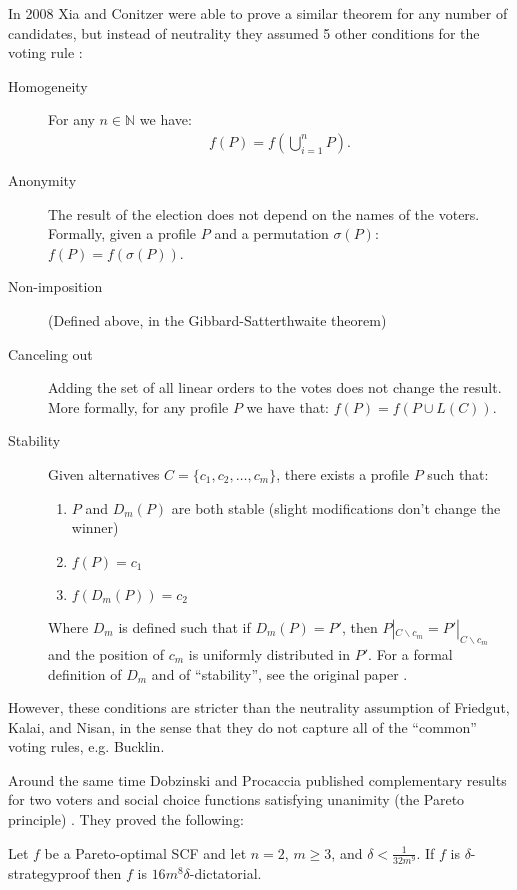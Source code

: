 	In 2008 Xia and Conitzer were able to prove a similar theorem for any number of candidates, but instead of neutrality they assumed 5 other conditions for the voting rule \cite{xia2008sufficient}:

	\begin{description}
		\item[Homogeneity] For any $n \in \mathbb{N}$ we have:
			\begin{align*}
				f(P) = f\left(\bigcup_{i=1}^n P\right).
			\end{align*}
		\item[Anonymity] The result of the election does not depend on the names of the voters. Formally, given a profile $P$ and a permutation $\sigma(P)$: $f(P) = f(\sigma(P))$.
		\item[Non-imposition] (Defined above, in the Gibbard-Satterthwaite theorem)
		\item[Canceling out] Adding the set of all linear orders to the votes does not change the result. More formally, for any profile $P$ we have that: $f(P) = f(P \cup L(C))$.
		\item[Stability] Given alternatives $C = \{c_1, c_2, \ldots, c_m\}$, there exists a profile $P$ such that:
			\begin{enumerate}
				\item $P$ and $D_{m}(P)$ are both stable (slight modifications don't change the winner)
				\item $f(P) = c_1$
				\item $f(D_{m}(P)) = c_2$
			\end{enumerate}
			Where $D_m$ is defined such that if $D_m(P) = P'$, then $P|_{C \backslash c_m} = P'|_{C \backslash c_m}$ and the position of $c_m$ is uniformly distributed in $P'$. For a formal definition of $D_m$ and of ``stability'', see the original paper \cite{xia2008sufficient}.
	\end{description}

	However, these conditions are stricter than the neutrality assumption of Friedgut, Kalai, and Nisan, in the sense that they do not capture all of the ``common'' voting rules, e.g. Bucklin.

	Around the same time Dobzinski and Procaccia published complementary results for two voters and social choice functions satisfying unanimity (the Pareto principle) \cite{dobzinski2008frequent}. They proved the following:

	\begin{theorem}
		Let $f$ be a Pareto-optimal SCF and let $n = 2$, $m \ge 3$, and $\delta < \frac{1}{32m^9}$. If $f$ is $\delta$-strategyproof then $f$ is $16m^8 \delta$-dictatorial.
	\end{theorem}

